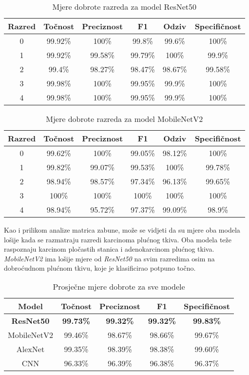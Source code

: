 \documentclass[conference, utf8]{IEEEtran}
\begin{document}
	\begin{table}[H]
		\centering
		\caption{Mjere dobrote razreda za model ResNet50}
		\label{table:4}
		\begin{tabular}{ |c|c|c|c|c|c| } 
			\hline
			Razred & Točnost & Preciznost & F1 & Odziv & Specifičnost \\
			\hline\hline
			0 & 99.92\% & 100\% & 99.8\% & 99.6\% & 100\% \\
			\hline
			1 & 99.92\% & 99.58\% & 99.79\% & 100\% & 99.9\% \\
			\hline
			2 & 99.4\% & 98.27\% & 98.47\% & 98.67\% & 99.58\% \\
			\hline
			3 & 99.98\% & 100\% & 99.95\% & 99.9\% & 100\% \\
			\hline
			4 & 99.98\% & 100\% & 99.95\% & 99.9\% & 100\% \\
			\hline
		\end{tabular}
	\end{table}
	\begin{table}[H]
		\centering
		\caption{Mjere dobrote razreda za model MobileNetV2}
		\label{table:5}
		\begin{tabular}{ |c|c|c|c|c|c| } 
			\hline
			Razred & Točnost & Preciznost & F1 & Odziv & Specifičnost \\
			\hline\hline
			0 & 99.62\% & 100\% & 99.05\% & 98.12\% & 100\% \\
			\hline
			1 & 99.82\% & 99.07\% & 99.53\% & 100\% & 99.78\% \\
			\hline
			2 & 98.94\% & 98.57\% & 97.34\% & 96.13\% & 99.65\% \\
			\hline
			3 & 100\% & 100\% & 100\% & 100\% & 100\% \\
			\hline
			4 & 98.94\% & 95.72\% & 97.37\% & 99.09\% & 98.9\% \\
			\hline
		\end{tabular}
	\end{table}
	
	Kao i prilikom analize matrica zabune, može se vidjeti da su mjere oba modela lošije kada se razmatraju razredi karcinoma plućnog tkiva. Oba modela teže raspoznaju karcinom pločastih stanica i adenokarcinom plućnog tkiva. \textit{MobileNetV2} ima lošije mjere od \textit{ResNet50} na svim razredima osim na dobroćudnom plućnom tkivu, koje je klasificirao potpuno točno. 
	
	
	\begin{table}[H]
		\centering
		\caption{Prosječne mjere dobrote za sve modele}
		\label{table:6}
		\begin{tabular}{ |c|c|c|c|c| } 
			\hline
			Model & Točnost & Preciznost & F1 &   Specifičnost \\
			\hline\hline
			\textbf{ResNet50} & \textbf{99.73\%} & \textbf{99.32\% }& \textbf{99.32\%} &  \textbf{99.83\%} \\
			\hline
			MobileNetV2 & 99.46\% & 98.67\% & 98.66\% &  99.67\% \\
			\hline
			AlexNet\cite{RAD1} & 99.35\% &	98.39\%	&98.38\% &	99.60\%
			\\
			\hline
			CNN\cite{RAD2} & 96.33\% & 96.39\% & 96.38\% & 96.37\% \\
			\hline
		\end{tabular}
	\end{table}
	
\end{document}
